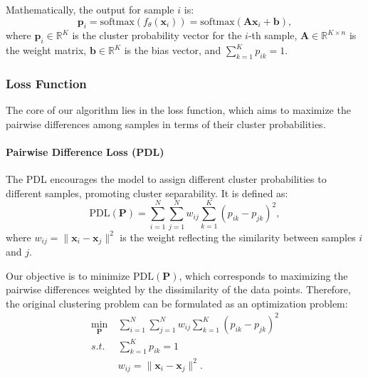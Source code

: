 \documentclass[journal]{IEEEtran}
\begin{document}
Mathematically, the output for sample \( i \) is:
\begin{equation} \label{eq1}
\mathbf{p}_i = \text{softmax}(f_{\theta}(\mathbf{x}_i)) = \text{softmax}(\mathbf{A} \mathbf{x}_i + \mathbf{b}),
\end{equation}
where \( \mathbf{p}_i \in \mathbb{R}^K \) is the cluster probability vector for the \( i \)-th sample, \( \mathbf{A} \in \mathbb{R}^{K \times n} \) is the weight matrix, \( \mathbf{b} \in \mathbb{R}^K \) is the bias vector, and \( \sum_{k=1}^K p_{ik} = 1 \).

\subsubsection{Loss Function}

The core of our algorithm lies in the loss function, which aims to maximize the pairwise differences among samples in terms of their cluster probabilities.

\paragraph{Pairwise Difference Loss (PDL)}

The PDL encourages the model to assign different cluster probabilities to different samples, promoting cluster separability. It is defined as:
\begin{equation} \label{eq2}
\text{PDL}(\mathbf{P}) = \sum_{i=1}^{N} \sum_{j=1}^{N} w_{ij} \sum_{k=1}^{K} \left( p_{ik} - p_{jk} \right)^2,
\end{equation}
where \( w_{ij} = \| \mathbf{x}_i - \mathbf{x}_j \|^2 \) is the weight reflecting the similarity between samples \( i \) and \( j \).

Our objective is to minimize \( \text{PDL}(\mathbf{P}) \), which corresponds to maximizing the pairwise differences weighted by the dissimilarity of the data points. Therefore, the original clustering problem can be formulated as an optimization problem:
\begin{equation} \label{eq3}
\begin{split}
\min_{\mathbf{P}} \ &\sum_{i=1}^{N} \sum_{j=1}^{N} w_{ij} \sum_{k=1}^{K} \left( p_{ik} - p_{jk} \right)^2 \\
s.t. \     &\sum_{k=1}^K p_{ik} = 1 \\
           &w_{ij} = \| \mathbf{x}_i - \mathbf{x}_j \|^2.
\end{split}
\end{equation}
\end{document}

